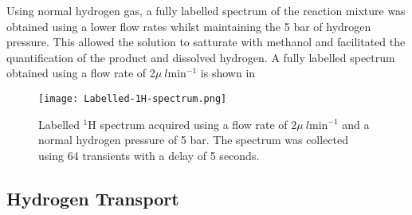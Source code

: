 Using normal hydrogen gas, a fully labelled spectrum of the reaction mixture
was obtained using a lower flow rates whilst maintaining
the 5 bar of hydrogen pressure. This allowed the solution to satturate with
methanol and facilitated the quantification of the product and dissolved hydrogen.
A fully labelled spectrum obtained using a flow rate of 2$\mu~l \text{min}^{-1}$
is shown in 

\begin{figure}
  \begin{center}
  \texttt{[image: Labelled-1H-spectrum.png]}
  \end{center}
  \caption{Labelled $^1$H spectrum acquired using a flow rate of 2$\mu~l \text{min}^{-1}$
  and a normal hydrogen pressure of 5 bar. The spectrum was collected using 64 transients
  with a delay of 5 seconds.}
  \label{fig:LabelledSpec}
\end{figure}

\subsection{Hydrogen Transport}


